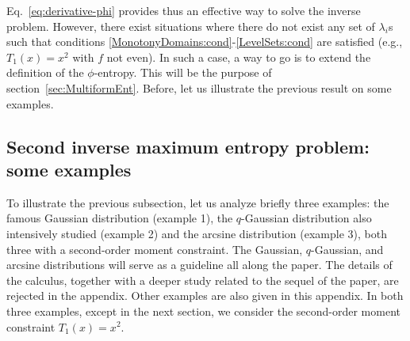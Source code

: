 \documentclass[entropy,article,submit,moreauthors,pdftex]{Definitions/mdpi}
\begin{document}
Eq.~\eqref{eq:derivative-phi}  provides  thus  an  effective way  to  solve  the
inverse problem.  However,  there exist situations where there do  not exist any
set         of         $\lambda_i$s         such         that         conditions
\ref{MonotonyDomains:cond}-\ref{LevelSets:cond} are  satisfied (e.g.,  $T_1(x) =
x^2$  with $f$  not  even).  In  such a  case,  a way  to  go is  to extend  the
definition   of   the   $\phi$-entropy.    This   will   be   the   purpose   of
section~\ref{sec:MultiformEnt}.  Before,  let us illustrate the  previous result
on some examples.




\subsection{Second inverse maximum entropy problem: some examples}
\label{subsec:MaxPhiEntExamples}

To illustrate  the previous subsection,  let us analyze briefly  three examples:
the famous Gaussian distribution (example 1), the $q$-Gaussian distribution also
intensively studied (example  2) and the arcsine distribution  (example 3), both
three with  a second-order moment  constraint.  The Gaussian,  $q$-Gaussian, and
arcsine distributions will serve as a guideline all along the paper. The details
of the  calculus, together  with a  deeper study  related to  the sequel  of the
paper,  are rejected  in the  appendix. Other  examples are  also given  in this
appendix. In  both three examples, except  in the next section,  we consider the
second-order moment constraint $T_1(x) = x^2$.
\end{document}
